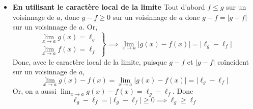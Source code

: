 \documentclass{article}
\begin{document}
\begin{question_kholle}
\begin{itemize}[label=$\star$]
		\item \textbf{En utilisant le caractère local de la limite}
		      Tout d'abord $f \leqslant g$ sur un voisinnage de $a$, donc $g - f \geqslant 0$ sur un voisinnage de $a$ donc $g-f = \lvert g-f \rvert$ sur un voisinnage de $a$.
		      Or,
		      $$
			      \left. \begin{array}{ll}
				      \lim_{ x \to a }g(x) = \ell_{g} \\
				      \lim_{ x \to a } f(x) = \ell_{f}
			      \end{array}\right\}
			      \implies \lim_{ x \to a } \lvert g(x) - f(x) \rvert  = \lvert \ell_{g} - \ell _{f} \rvert
		      $$
		      Donc, avec le caractère local de la limite, puisque $g-f$ et $|g-f|$ coïncident sur un voisinnage de $a$,
		      $$
			      \lim_{ x \to a } g(x) - f(x) = \lim_{ x \to a } \lvert g(x) - f(x) \rvert  = \lvert \ell_{g} - \ell_{f} \rvert
		      $$
		      Or,  on a aussi $\lim_{ x \to a }g(x) - f(x) = \ell_{g} - \ell_{f}$.
		      Donc
		      $$
			      \ell_{g} - \ell_{f} = \lvert \ell_{g} - \ell_{f} \rvert \geqslant 0 \implies \ell_{g} \geqslant \ell_{f}
		      $$
	\end{itemize}
\end{question_kholle}
\end{document}
